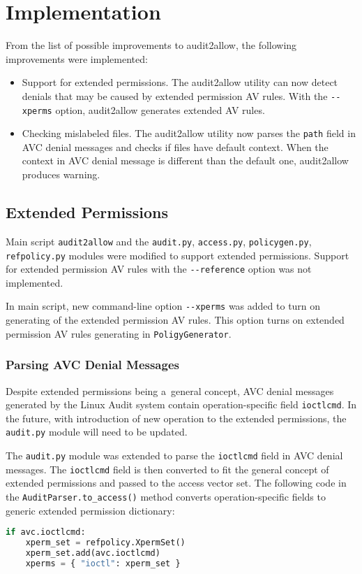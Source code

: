 \chapter{Implementation}
From the list of possible improvements to audit2allow, the following
improvements were implemented:
\begin{itemize}
    \item Support for extended permissions. The audit2allow utility can now
        detect denials that may be caused by extended permission AV rules. With
        the \texttt{-{}-xperms} option, audit2allow generates extended AV rules.
    \item Checking mislabeled files. The audit2allow utility now parses the
        \texttt{path} field in AVC denial messages and checks if files have
        default context. When the context in AVC denial message is different
        than the default one, audit2allow produces warning.
\end{itemize}

\section{Extended Permissions}
\label{xpermsimp}
Main script \texttt{audit2allow} and the \texttt{audit.py}, \texttt{access.py},
\texttt{policygen.py}, \texttt{refpolicy.py} modules were modified to support
extended permissions. Support for extended permission AV rules with the
\texttt{-{}-reference} option was not implemented.

In main script, new command-line option \texttt{-{}-xperms} was added to turn on
generating of the extended permission AV rules. This option turns on extended
permission AV rules generating in \texttt{PoligyGenerator}.

\subsection{Parsing AVC Denial Messages}
Despite extended permissions being a~general concept, AVC denial messages
generated by the Linux Audit system contain operation-specific field
\texttt{ioctlcmd}. In the future, with introduction of new operation to the
extended permissions, the \texttt{audit.py} module will need to be updated.

The \texttt{audit.py} module was extended to parse the \texttt{ioctlcmd} field
in AVC denial messages. The \texttt{ioctlcmd} field is then converted to fit the
general concept of extended permissions and passed to the access vector set. The
following code in the \texttt{AuditParser.to\_access()} method converts
operation-specific fields to generic extended permission dictionary:
\begin{lstlisting}[language=Python]
if avc.ioctlcmd:
    xperm_set = refpolicy.XpermSet()
    xperm_set.add(avc.ioctlcmd)
    xperms = { "ioctl": xperm_set }
\end{lstlisting}

